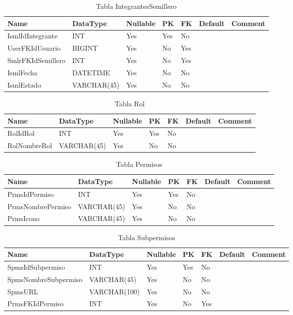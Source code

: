 \begin{table}
	\caption{Tabla IntegrantesSemillero}
	\label{labelTableIntegrantesSemillero}
	\begin{tabular}{ |l|l|l|l|l|l|l| }
		\hline
		Name & DataType & Nullable & PK & FK & Default & Comment \\ \hline
		IsmlIdIntegrante & INT & Yes & Yes & No &  & \\ \hline 
		UserFKIdUsuario & BIGINT & Yes & No & Yes &  & \\ \hline 
		SmlrFKIdSemillero & INT & Yes & No & Yes &  & \\ \hline 
		IsmlFecha & DATETIME & Yes & No & No &  & \\ \hline 
		IsmlEstado & VARCHAR(45) & Yes & No & No &  & \\ \hline 
		
	\end{tabular}
\end{table}


\begin{table}
	\caption{Tabla Rol}
	\label{labelTableRol}
	\begin{tabular}{ |l|l|l|l|l|l|l| }
		\hline
		Name & DataType & Nullable & PK & FK & Default & Comment \\ \hline
		RolIdRol & INT & Yes & Yes & No &  & \\ \hline 
		RolNombreRol & VARCHAR(45) & Yes & No & No &  & \\ \hline 
		
	\end{tabular}
\end{table}


\begin{table}
	\caption{Tabla Permisos}
	\label{labelTablePermisos}
	\begin{tabular}{ |l|l|l|l|l|l|l| }
		\hline
		Name & DataType & Nullable & PK & FK & Default & Comment \\ \hline
		PrmsIdPermiso & INT & Yes & Yes & No &  & \\ \hline 
		PrmsNombrePermiso & VARCHAR(45) & Yes & No & No &  & \\ \hline 
		PrmsIcono & VARCHAR(45) & Yes & No & No &  & \\ \hline 
		
	\end{tabular}
\end{table}


\begin{table}
	\caption{Tabla Subpermisos}
	\label{labelTableSubpermisos}
	\begin{tabular}{ |l|l|l|l|l|l|l| }
		\hline
		Name & DataType & Nullable & PK & FK & Default & Comment \\ \hline
		SpmsIdSubpermiso & INT & Yes & Yes & No &  & \\ \hline 
		SpmsNombreSubpermiso & VARCHAR(45) & Yes & No & No &  & \\ \hline 
		SpmsURL & VARCHAR(100) & Yes & No & No &  & \\ \hline 
		PrmsFKIdPermiso & INT & Yes & No & Yes &  & \\ \hline 
		
	\end{tabular}
\end{table}


